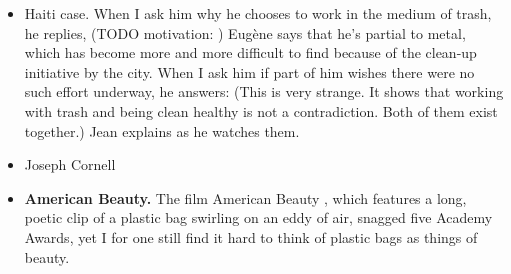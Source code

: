 \begin{itemize}

\item Haiti case. When I ask him why he chooses to work in the medium of trash, he replies,  (TODO motivation: ) Eugène says that he’s partial to metal, which has become more and more difficult to find because of the clean-up initiative by the city. When I ask him if part of him wishes there were no such effort underway, he answers:  (This is very strange. It shows that working with trash and being clean healthy is not a contradiction. Both of them exist together.)  Jean explains as he watches them.


\item Joseph Cornell

\item \textbf{American Beauty.} The film American Beauty , which features a long, poetic clip of a plastic bag swirling on an eddy of air, snagged five Academy Awards, yet I for one still find it hard to think of plastic bags as things of beauty. 


\end{itemize}
